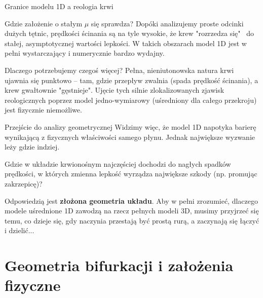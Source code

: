 \documentclass[aspectratio=169]{beamer}
\begin{document}
\begin{frame}{Granice modelu 1D a reologia krwi}
    \begin{block}{Gdzie założenie o stałym $\mu$ się sprawdza?}
        Dopóki analizujemy proste odcinki dużych tętnic, prędkości ścinania są na tyle wysokie, że krew "rozrzedza się"~ do stałej, asymptotycznej wartości lepkości. W takich obszarach model 1D jest w pełni wystarczający i numerycznie bardzo wydajny.
    \end{block}

    \vspace{0.3cm}

    \begin{block}{Dlaczego potrzebujemy czegoś więcej?}
        Pełna, nieniutonowska natura krwi ujawnia się punktowo – tam, gdzie przepływ zwalnia (spada prędkość ścinania), a krew gwałtownie "gęstnieje". Ujęcie tych silnie zlokalizowanych zjawisk reologicznych poprzez model jedno-wymiarowy (uśredniony dla całego przekroju) jest fizycznie niemożliwe.
    \end{block}
\end{frame}

\begin{frame}{Przejście do analizy geometrycznej}
    Widzimy więc, że model 1D napotyka barierę wynikającą z fizycznych właściwości samego płynu. Jednak największe wyzwanie leży gdzie indziej.

    \vspace{0.3cm}
    Gdzie w układzie krwionośnym najczęściej dochodzi do nagłych spadków prędkości, w których zmienna lepkość wyrządza największe szkody (np. promując zakrzepicę)? 

    \vspace{0.3cm}
    Odpowiedzią jest \textbf{złożona geometria układu}. Aby w pełni zrozumieć, dlaczego modele uśrednione 1D zawodzą na rzecz pełnych modeli 3D, musimy przyjrzeć się temu, co dzieje się, gdy naczynia przestają być prostą rurą, a zaczynają się łączyć i dzielić...
\end{frame}

\section{Geometria bifurkacji i założenia fizyczne}
\end{document}
